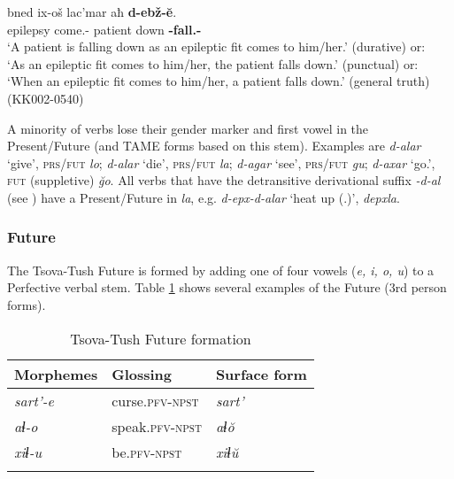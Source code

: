 \begin{exe}
	\ex\label{verbflex-ex02}
	
	
		\gll bned ix-oš lac'mar aħ \textbf{d-ebž-\u{e}}. \\
		epilepsy come.{\Ipfv}-{\Simul} patient down \textbf{{\D}-fall.{\Ipfv}-{\Npst}} \\
		\trans `A patient is falling down as an epileptic fit comes to him/her.' (durative) or:  \\ `As an epileptic fit comes to him/her, the patient falls down.' (punctual) or: \\ `When an epileptic fit comes to him/her, a patient falls down.' (general truth)
		\hfill (KK002-0540)
	
	
\end{exe}

A minority of verbs lose their gender marker and first vowel in the Present/Future (and TAME forms based on this stem). Examples are \textit{d-alar} `give', \textsc{prs/fut} \textit{lo}; \textit{d-alar} `die', \textsc{prs/fut} \textit{la}; \textit{d-agar} `see', \textsc{prs/fut} \textit{gu}; \textit{d-axar} `go.{\Pfv}', \textsc{fut} (suppletive) \textit{\u{g}o}. All verbs that have the detransitive derivational suffix \textit{-d-al} (see ) have a Present/Future in \textit{la}, e.g. \textit{d-epx-d-alar} `heat up ({\Intr}.{\Ipfv})', {\Prs} \textit{depxla}.

\subsubsection{Future}
The Tsova-Tush Future is formed by adding one of four vowels (\textit{e, i, o, u}) to a Perfective verbal stem. Table \ref{TAME-table2} shows several examples of the Future (3rd person forms). 

\begin{table}
	\begin{tabular}{lll}
		\lsptoprule
		Morphemes & {Glossing} & {Surface form} \\\midrule
		\textit{sart'-e} & curse.\textsc{pfv-npst} & \textit{sart'} \\
		\textit{aɬ-o} & speak.\textsc{pfv-npst} & \textit{aɬ\u{o}} \\
		\textit{xiɬ-u} & be.\textsc{pfv-npst} & \textit{xiɬ\u{u}} \\
		\lspbottomrule
	\end{tabular}
	\caption{Tsova-Tush Future formation}
	\label{TAME-table2}
\end{table}

